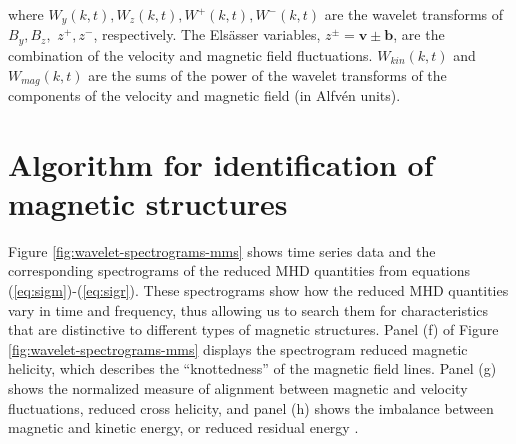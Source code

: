 \noindent  where $W_y(k,t),W_z(k,t),W^+(k,t), W^-(k,t)$ are the wavelet transforms of $B_y, B_z,$ $z^+, z^-$, respectively. The Els\"asser variables, $z^\pm = \mathbf{v} \pm \mathbf{b}$, are the combination of the velocity and magnetic field fluctuations. $W_{kin}(k,t)$ and $W_{mag}(k,t)$ are the sums of the power of the wavelet transforms of the components of the velocity and magnetic field (in Alfv\'en units).



\section{Algorithm for identification of magnetic structures} \label{sec:wavelet-algorithm}
Figure \ref{fig:wavelet-spectrograms-mms} shows time series data and the corresponding spectrograms of the reduced MHD quantities from equations (\ref{eq:sigm})-(\ref{eq:sigr}). These spectrograms show how the reduced MHD quantities vary in time and frequency, thus allowing us to search them for characteristics that are distinctive to different types of magnetic structures. Panel (f) of Figure \ref{fig:wavelet-spectrograms-mms} displays the spectrogram reduced magnetic helicity, which describes the “knottedness” of the magnetic field lines. Panel (g) shows the normalized measure of alignment between magnetic and velocity fluctuations, reduced cross helicity, and panel (h) shows the imbalance between magnetic and kinetic energy, or reduced residual energy \cite{Matthaeus:1982}.

